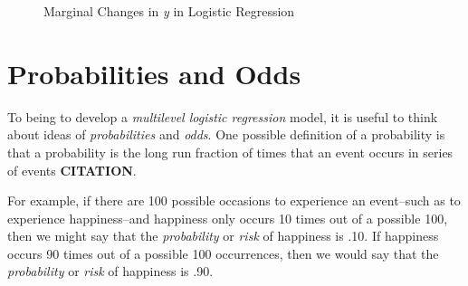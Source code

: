 \documentclass[
  letterpaper,
  DIV=11,
  numbers=noendperiod]{scrreprt}
\begin{document}
\begin{figure}


\caption{\label{fig-marginal-changes}Marginal Changes in \emph{y} in
Logistic Regression}

\end{figure}%

\section{Probabilities and Odds}\label{probabilities-and-odds}

To being to develop a \emph{multilevel logistic regression} model, it is
useful to think about ideas of \emph{probabilities} and \emph{odds}. One
possible definition of a probability is that a probability is the long
run fraction of times that an event occurs in series of events
\textbf{CITATION}. 

For example, if there are 100 possible occasions to experience an
event--such as to experience happiness--and happiness only occurs 10
times out of a possible 100, then we might say that the
\emph{probability} or \emph{risk} of happiness is .10. If happiness
occurs 90 times out of a possible 100 occurrences, then we would say
that the \emph{probability} or \emph{risk} of happiness is .90.
\end{document}
